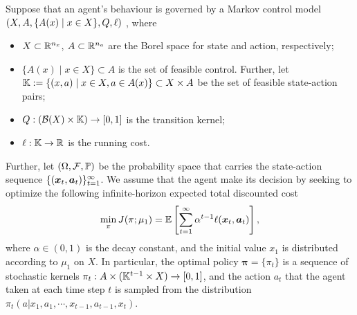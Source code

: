 

Suppose that an agent's behaviour is governed by a Markov control model $(X,A,\{A(x) \mid x\in X\},Q,\relax{\ell})$ \citep[Def.~2.2.1]{savorgnan2009discrete}, where
\begin{itemize}
\item $X\subset\mathbb{R}^{n_x}$, $A\subset\mathbb{R}^{n_a}$ are the Borel space for state and action, respectively;
\item $\{A(x) \mid x\in X\}\subset A$ is the set of feasible control. Further, let $\mathbb{K}:=\{(x,a) \mid x\in X,a\in A(x)\}\subset X\times A$ be the set of feasible state-action pairs;
\item $Q:(\mathcal{B}(X)\times \mathbb{K})\rightarrow [0,1]$ is the transition kernel;
\item $\relax{\ell}:\mathbb{K}\rightarrow\mathbb{R}$ is the running cost.
\end{itemize}
Further, let $(\Omega,\mathcal{F},\operatorname*{\mathbb{P}})$ be the probability space that carries the state-action sequence $\{(\bm{x}_t,\bm{a}_t)\}_{t=1}^\infty$.
We assume that the agent make its decision by seeking to optimize the following infinite-horizon expected total discounted cost
\begin{align}
\min_{\pi}J(\pi;\mu_1)=\operatorname*{\mathbb{E}}\left[\sum_{t=1}^\infty\alpha^{t-1}\relax{\ell}(\bm{x}_t,\bm{a}_t)\right],\label{eq:forward_problem_obj_fun}
\end{align}
where $\alpha\in(0,1)$ is the decay constant, and the initial value $x_1$ is distributed according to $\mu_1$ on $X$.
In particular, the optimal policy $\bm{\pi}=\{\pi_t\}$ is a sequence of stochastic kernels $\pi_t:A\times (\mathbb{K}^{t-1}\times X)\rightarrow [0,1]$, and the action $a_t$ that the agent taken at each time step $t$ is sampled from the distribution $\pi_t(a|x_1,a_1,\cdots,x_{t-1},a_{t-1},x_t)$.

